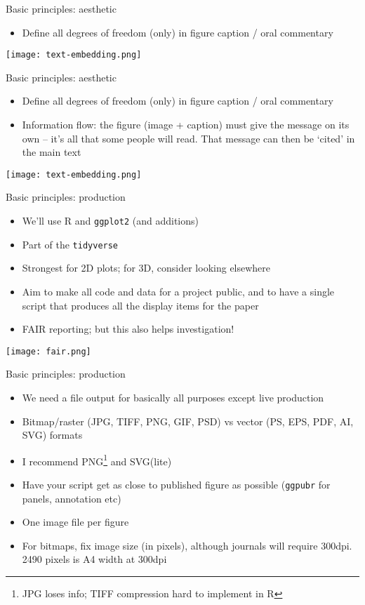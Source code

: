 \documentclass[10pt]{beamer}
\begin{document}
\begin{frame}{Basic principles: aesthetic}
    \begin{itemize}
    \item Define all degrees of freedom (only) in figure caption / oral commentary
    \end{itemize}
    \texttt{[image: text-embedding.png]}
\end{frame}

\begin{frame}{Basic principles: aesthetic}
    \begin{itemize}
    \item Define all degrees of freedom (only) in figure caption / oral commentary
      \item Information flow: the figure (image + caption) must give the message on its own -- it's all that some people will read. That message can then be `cited' in the main text
    \end{itemize}
    \centering
    \texttt{[image: text-embedding.png]}
\end{frame}


\begin{frame}{Basic principles: production}
    \begin{itemize}
    \item We'll use R and \texttt{ggplot2} (and additions)
      \item Part of the \texttt{tidyverse}
      \item Strongest for 2D plots; for 3D, consider looking elsewhere
            \item Aim to make all code and data for a project public, and to have a single script that produces all the display items for the paper
            \item FAIR reporting; but this also helps investigation!
              
    \end{itemize}
    \texttt{[image: fair.png]}
\end{frame}

\begin{frame}{Basic principles: production}
    \begin{itemize}[<+->]
      \item We need a file output for basically all purposes except live production
    \item Bitmap/raster (JPG, TIFF, PNG, GIF, PSD) vs vector (PS, EPS, PDF, AI, SVG) formats
    \item I recommend PNG\footnote{JPG loses info; TIFF compression hard to implement in R} and SVG(lite)
    \item Have your script get as close to published figure as possible (\texttt{ggpubr} for panels, annotation etc)
    \item One image file per figure
      \item For bitmaps, fix image size (in pixels), although journals will require 300dpi. 2490 pixels is A4 width at 300dpi
  \end{itemize}
\end{frame}
\end{document}
